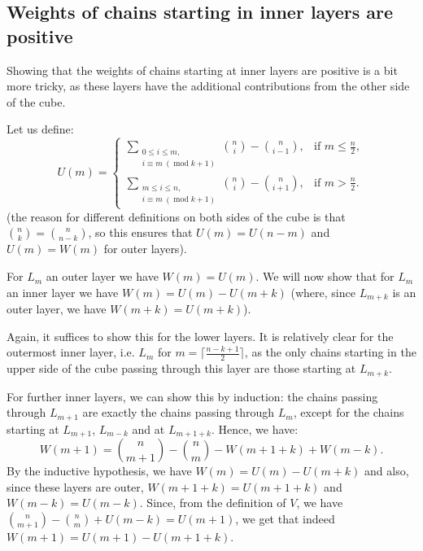 \documentclass[11pt, reqno]{amsart}
\numberwithin{equation}{section}
\newcommand\modd{\operatorname{mod}}
\begin{document}
\subsection{Weights of chains starting in inner layers are positive}

Showing that the weights of chains starting at inner layers are positive is a bit more tricky, as these layers have the additional contributions from the other side of the cube.

Let us define:
\begin{equation}
    U(m)= \begin{cases}
        \displaystyle \sum_{\substack{0 \leqslant i \leqslant m, \\ i \equiv m \ (\modd k+1)}} \binom{n}{i} - \binom{n}{i-1}, & \text{if } m\leqslant\frac{n}{2}, \\
         \displaystyle\sum_{\substack{m \leqslant i \leqslant n, \\ i \equiv m \ (\modd k+1)}} \binom{n}{i} - \binom{n}{i+1}, & \text{if } m>\frac{n}{2}.
    \end{cases}
\end{equation}
(the reason for different definitions on both sides of the cube is that $\binom{n}{k}=\binom{n}{n-k}$, so this ensures that $U(m)=U(n-m)$ and $U(m)=W(m)$ for outer layers).

For $L_m$ an outer layer we have $W(m)=U(m)$. We will now show that for $L_m$ an inner layer we have $W(m)=U(m)-U(m+k)$ (where, since $L_{m+k}$ is an outer layer, we have $W(m+k)=U(m+k)$).

Again, it suffices to show this for the lower layers. It is relatively clear for the outermost inner layer, i.e. $L_m$ for $m= \Big\lceil \frac{n-k+1}{2} \Big\rceil$, as the only chains starting in the upper side of the cube passing through this layer are those starting at $L_{m+k}$.

For further inner layers, we can show this by induction: the chains passing through $L_{m+1}$ are exactly the chains passing through $L_{m}$, except for the chains starting at $L_{m+1}$, $L_{m-k}$ and at $L_{m+1+k}$. Hence, we have:
\begin{equation}
    W(m+1)=\binom{n}{m+1}-\binom{n}{m} - W(m+1+k)+W(m-k).
\end{equation}
By the inductive hypothesis, we have $W(m)=U(m)-U(m+k)$ and also, since these layers are outer, $W(m+1+k)=U(m+1+k)$ and $W(m-k)=U(m-k)$. Since, from the definition of $V$, we have $\binom{n}{m+1}-\binom{n}{m} + U(m-k)=U(m+1)$, we get that indeed $W(m+1)=U(m+1)-U(m+1+k)$.
\end{document}
